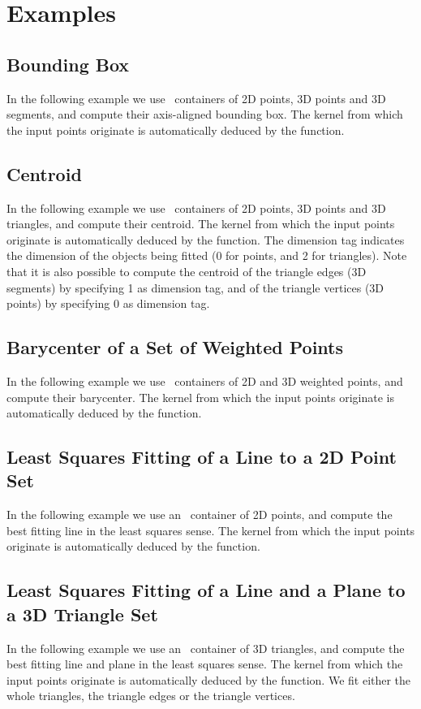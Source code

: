 \section{Examples\label{subsec:pca_examples}}

\subsection{Bounding Box}
In the following example we use \stl\ containers of 2D points, 3D points and 3D segments, and compute their axis-aligned bounding box. The kernel from which the input points originate is automatically deduced by the function.

\subsection{Centroid}
In the following example we use \stl\ containers of 2D points, 3D points and 3D triangles, and compute their centroid. The kernel from which the input points originate is automatically deduced by the function. The dimension tag indicates the dimension of the objects being fitted (0 for points, and 2 for triangles). Note that it is also possible to compute the centroid of the triangle edges (3D segments) by specifying 1 as dimension tag, and of the triangle vertices (3D points) by specifying 0 as dimension tag.

\subsection{Barycenter of a Set of Weighted Points}
In the following example we use \stl\ containers of 2D and 3D weighted points, and compute their barycenter. The kernel from which the input points originate is automatically deduced by the function.

\subsection{Least Squares Fitting of a Line to a 2D Point Set}
In the following example we use an \stl\ container of 2D points, and compute the best fitting line in the least squares sense. The kernel from which the input points originate is automatically deduced by the function.

\subsection{Least Squares Fitting of a Line and a Plane to a 3D Triangle Set}
In the following example we use an \stl\ container of 3D triangles, and compute the best fitting line and plane in the least squares sense. The kernel from which the input points originate is automatically deduced by the function. We fit either the whole triangles, the triangle edges or the triangle vertices.

